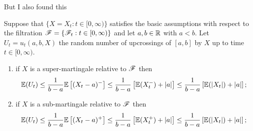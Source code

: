 \documentclass{report}
\begin{document}
But I also found this
\begin{proposition}
Suppose that $\{X={X_{t}:t\in[0,\infty)}\}$ satisfies the basic assumptions with respect to the filtration $\mathscr{F}=\{\mathscr{F}_t:t\in[0,\infty)\}$ and let $a,b\in\mathbb{R}$ with $a<b$. Let $U_{t}=u_{t}(a,b,X)$ the random number of upcrossings of $[a,b]$ by $X$ up to time $t\in[0,\infty)$. 
\begin{enumerate}[\circnum]
	\item if $X$ is a super-martingale relative to $\mathscr{F}$ then
	\begin{equation*}
		\mathbb{E}(U_{t})\leq\frac{1}{b-a}\mathbb{E}\left[(X_{t}-a)^{-}\right]\leq\frac{1}{b-a}\left[\mathbb{E}(X_{t}^-)+|a|\right]\leq\frac{1}{b-a}\left[\mathbb{E}(|X_{t}|)+|a|\right];
	\end{equation*}
	\item if $X$ is a sub-martingale relative to $\mathscr{F}$ then
	\begin{equation*}
			\mathbb{E}(U_{t})\leq\frac{1}{b-a}\mathbb{E}\left[(X_{t}-a)^{+}\right]\leq\frac{1}{b-a}\left[\mathbb{E}(X_{t}^+)+|a|\right]\leq\frac{1}{b-a}\left[\mathbb{E}(|X_{t}|)+|a|\right];
	\end{equation*}
\end{enumerate}	
\end{proposition}
\end{document}
